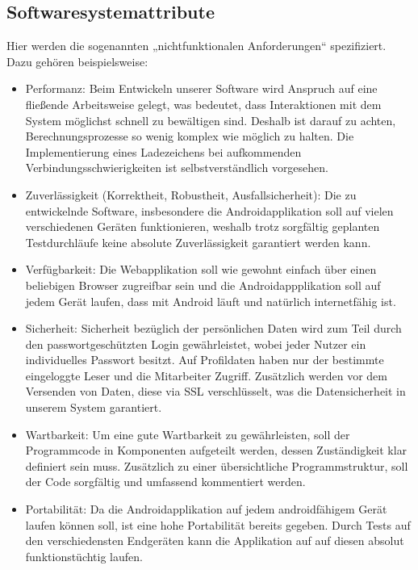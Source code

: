\documentclass[fontsize=12pt,paper=a4,twoside]{scrartcl}
\begin{document}
\subsection{Softwaresystemattribute} \label{subsec:SoftwareAttribute} Hier werden die sogenannten „nichtfunktionalen Anforderungen“ spezifiziert. Dazu gehören beispielsweise: 
\begin{itemize}
	\item Performanz: Beim Entwickeln unserer Software wird Anspruch auf eine fließende Arbeitsweise gelegt, was bedeutet, dass Interaktionen mit dem System möglichst schnell zu bewältigen sind. Deshalb ist darauf zu achten, Berechnungsprozesse so wenig komplex wie möglich zu halten. Die Implementierung eines Ladezeichens bei aufkommenden Verbindungsschwierigkeiten ist selbstverständlich vorgesehen.
	
	\item Zuverlässigkeit (Korrektheit, Robustheit, Ausfallsicherheit): Die zu entwickelnde Software, insbesondere die Androidapplikation soll auf vielen verschiedenen Geräten funktionieren, weshalb trotz sorgfältig geplanten Testdurchläufe keine absolute Zuverlässigkeit garantiert werden kann. 
	
	\item Verfügbarkeit: Die Webapplikation soll wie gewohnt einfach über einen beliebigen Browser zugreifbar sein und die Androidappplikation soll auf jedem Gerät laufen, dass mit Android läuft und natürlich internetfähig ist. 
	
	\item Sicherheit: Sicherheit bezüglich der persönlichen Daten wird zum Teil durch den passwortgeschützten Login gewährleistet, wobei jeder Nutzer ein individuelles Passwort besitzt. Auf Profildaten haben nur der bestimmte eingeloggte Leser und die Mitarbeiter Zugriff. Zusätzlich werden vor dem Versenden von Daten, diese via SSL verschlüsselt, was die Datensicherheit in unserem System garantiert.
	
	\item Wartbarkeit: Um eine gute Wartbarkeit zu gewährleisten, soll der Programmcode in Komponenten aufgeteilt werden, dessen Zuständigkeit klar definiert sein muss. Zusätzlich zu einer übersichtliche Programmstruktur, soll der Code sorgfältig und umfassend kommentiert werden.
	
	\item Portabilität: Da die Androidapplikation auf jedem androidfähigem Gerät laufen können soll, ist eine hohe Portabilität bereits gegeben. Durch Tests auf den verschiedensten Endgeräten kann die Applikation auf auf diesen absolut funktionstüchtig laufen. 
\end{itemize}
\end{document}
